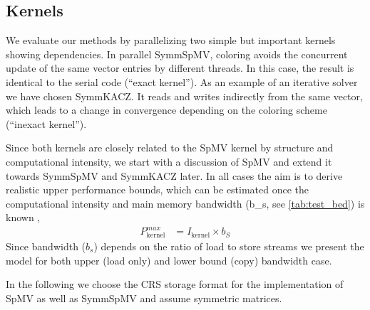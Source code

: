 \subsection{Kernels} \label{subsec:test_kernels}
We evaluate our methods by parallelizing two simple but important kernels showing \DTWO dependencies. In parallel \acrfull{SymmSpMV}, \DTWO coloring avoids the concurrent update of the same vector entries by different threads. In this case, the result is identical to the serial code (``exact kernel''). As an example of an iterative solver we have chosen \acrfull{SymmKACZ}. It reads and writes indirectly from the same vector, which leads to a change in convergence depending on the coloring scheme (``inexact kernel'').

Since both kernels are closely related to the \acrshort{SpMV} kernel by structure and computational intensity, we start with a discussion of \acrshort{SpMV} and extend it towards \acrshort{SymmSpMV} and \acrshort{SymmKACZ} later. In all cases the aim is to derive realistic upper performance bounds, which can be estimated once the computational intensity and main memory bandwidth (\acrshort{b_s}, see \cref{tab:test_bed}) is known \cite{Williams_roofline}, \ie
  \begin{align}
   	\label{eq:upper_performance}
   	P^{max}_\mathrm{kernel}  &= I_\mathrm{kernel}  \times b_S
  \end{align}
Since bandwidth ($b_s$) depends on the ratio of load to store streams we present the model for both upper (load only) and lower bound (copy) bandwidth case.  
  
  In the following we choose the \acrshort{CRS} storage format for the  implementation of \acrshort{SpMV} as well as  \acrshort{SymmSpMV} and assume symmetric matrices.

